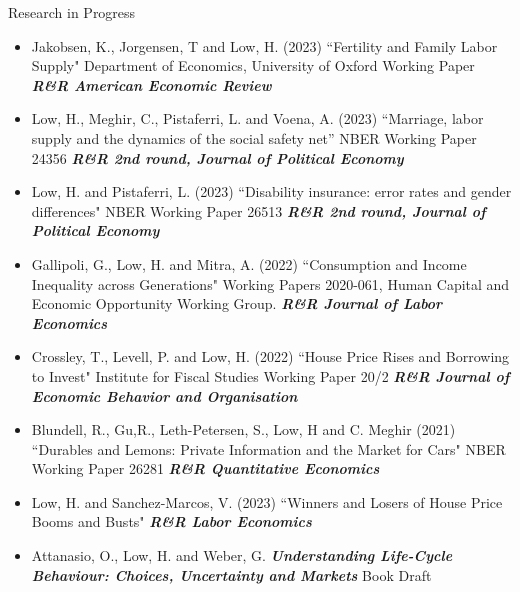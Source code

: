 \documentclass{resume} %
\begin{document}
\begin{rSection}{Research in Progress}
\begin{itemize} 
\item Jakobsen, K., Jorgensen, T and Low, H. (2023) ``Fertility and Family Labor Supply" Department of Economics, University of Oxford Working Paper \textit{\textbf{R\&R American Economic Review}}
\item Low, H., Meghir, C., Pistaferri, L. and Voena, A. (2023) ``Marriage, labor supply and the dynamics of the social safety net” NBER Working Paper 24356 \textit{\textbf{R\&R 2nd round, Journal of Political Economy}}
\item Low, H. and Pistaferri, L. (2023) ``Disability insurance: error rates and gender differences" NBER Working Paper 26513  \textit{\textbf{R\&R 2nd round, Journal of Political Economy}}
\item Gallipoli, G., Low, H. and Mitra, A. (2022) ``Consumption and Income Inequality across Generations" Working Papers 2020-061, Human Capital and Economic Opportunity Working Group. \textit{\textbf{R\&R Journal of Labor Economics}}
\item Crossley, T., Levell, P. and Low, H. (2022) ``House Price Rises and Borrowing to Invest"  Institute for Fiscal Studies Working Paper 20/2 \textit{\textbf{R\&R Journal of Economic Behavior and Organisation}}
\item Blundell, R., Gu,R., Leth-Petersen, S., Low, H and C. Meghir (2021)  ``Durables and Lemons: Private Information and the Market for Cars" NBER Working Paper 26281  \textit{\textbf{R\&R Quantitative Economics}}
\item Low, H. and Sanchez-Marcos, V. (2023) ``Winners and Losers of  House Price Booms and Busts" \textit{\textbf{R\&R Labor Economics}} 
\item Attanasio, O., Low, H. and Weber, G. \textit{\textbf{Understanding Life-Cycle Behaviour: Choices, Uncertainty and Markets}} Book Draft
\end{itemize}


\end{rSection}
\vspace{0.5cm}
\end{document}
